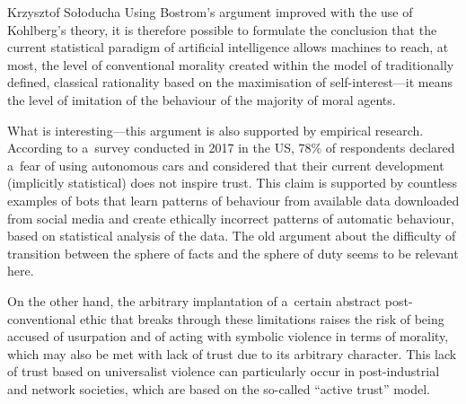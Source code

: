 \begin{artengenv}{Krzysztof Sołoducha}
Using Bostrom's argument improved with the use of Kohlberg's theory, it is therefore possible to formulate the conclusion that the current statistical paradigm of artificial intelligence allows machines to reach, at most, the level of conventional morality created within the model of traditionally defined, classical rationality based on the maximisation of self-interest—it means the level of imitation of the behaviour of the majority of moral agents.

What is interesting—this argument is also supported by empirical research. According to a~survey conducted in 2017 in the US, 78\% of respondents declared a~fear of using autonomous cars
\parencite[][]{edmonds_americans_2017} %
 and considered that their current development (implicitly statistical) does not inspire trust. This claim is supported by countless examples of bots that learn patterns of behaviour from available data downloaded from social media and create ethically incorrect patterns of automatic behaviour, based on statistical analysis of the data. The old argument about the difficulty of transition between the sphere of facts and the sphere of duty seems to be relevant here.

On the other hand, the arbitrary implantation of a~certain abstract post-conventional ethic that breaks through these limitations raises the risk of being accused of usurpation and of acting with symbolic violence in terms of morality, which may also be met with lack of trust due to its arbitrary character. This lack of trust based on universalist violence can particularly occur in post-industrial and network societies, which are based on the so-called ``active trust'' model.


\end{artengenv}
